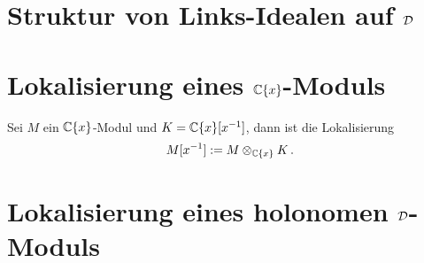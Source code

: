 \section{Struktur von Links-Idealen auf $\mathcal{D}$}

\section{Lokalisierung eines $\mathbb{C}\{x\}$-Moduls}

\begin{defn}
  Sei $M$ ein $\mathbb{C}\{x\}$-Modul und $K=\mathbb{C}\{x\}[x^{-1}]$, dann ist die
  Lokalisierung
  \[ M[x^{-1}]:=M\otimes_{\mathbb{C}\{x\}}K \,. \]
\end{defn}

\section{Lokalisierung eines holonomen $\mathcal{D}$-Moduls}

